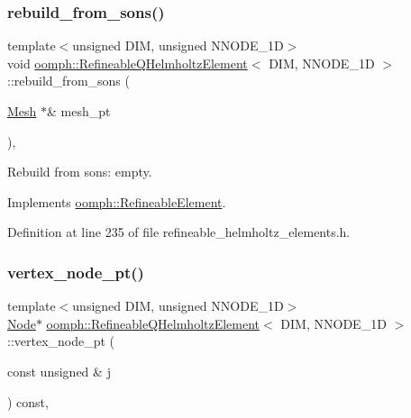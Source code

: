 \subsubsection{\texorpdfstring{rebuild\+\_\+from\+\_\+sons()}{rebuild\_from\_sons()}}
{\footnotesize\ttfamily template$<$unsigned D\+IM, unsigned N\+N\+O\+D\+E\+\_\+1D$>$ \\
void \hyperlink{classoomph_1_1RefineableQHelmholtzElement}{oomph\+::\+Refineable\+Q\+Helmholtz\+Element}$<$ D\+IM, N\+N\+O\+D\+E\+\_\+1D $>$\+::rebuild\+\_\+from\+\_\+sons (\begin{DoxyParamCaption}\item[{\hyperlink{classoomph_1_1Mesh}{Mesh} $\ast$\&}]{mesh\+\_\+pt }\end{DoxyParamCaption})\hspace{0.3cm}{\ttfamily [inline]}, {\ttfamily [virtual]}}



Rebuild from sons\+: empty. 



Implements \hyperlink{classoomph_1_1RefineableElement_a33324be27833fa4b78279d17158215fa}{oomph\+::\+Refineable\+Element}.



Definition at line 235 of file refineable\+\_\+helmholtz\+\_\+elements.\+h.

\mbox{\label{classoomph_1_1RefineableQHelmholtzElement_a516240c69abf031a5d1c791043bd1d8b}} 
\subsubsection{\texorpdfstring{vertex\+\_\+node\+\_\+pt()}{vertex\_node\_pt()}}
{\footnotesize\ttfamily template$<$unsigned D\+IM, unsigned N\+N\+O\+D\+E\+\_\+1D$>$ \\
\hyperlink{classoomph_1_1Node}{Node}$\ast$ \hyperlink{classoomph_1_1RefineableQHelmholtzElement}{oomph\+::\+Refineable\+Q\+Helmholtz\+Element}$<$ D\+IM, N\+N\+O\+D\+E\+\_\+1D $>$\+::vertex\+\_\+node\+\_\+pt (\begin{DoxyParamCaption}\item[{const unsigned \&}]{j }\end{DoxyParamCaption}) const\hspace{0.3cm}{\ttfamily [inline]}, {\ttfamily [virtual]}}



